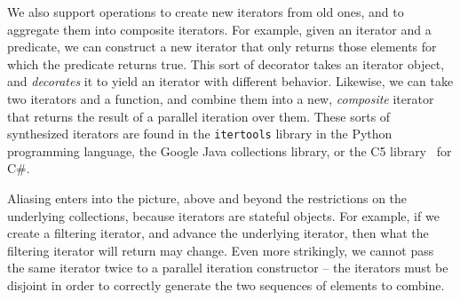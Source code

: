 \documentclass[preprint,natbib]{sigplanconf}
\begin{document}
We also support operations to create new iterators from old ones, and
to aggregate them into composite iterators. For example, given an
iterator and a predicate, we can construct a new iterator that only
returns those elements for which the predicate returns true. This sort
of decorator takes an iterator object, and \emph{decorates} it to
yield an iterator with different behavior. Likewise, we can take two
iterators and a function, and combine them into a new,
\emph{composite} iterator that returns the result of a parallel
iteration over them.  These sorts of synthesized iterators are found
in the \texttt{itertools} library in the Python programming language,
the Google Java collections library, or the C5 library~\cite{C5} for
C\#.

Aliasing enters into the picture, above and beyond the restrictions on
the underlying collections, because iterators are stateful
objects. For example, if we create a filtering iterator, and advance
the underlying iterator, then what the filtering iterator will return
may change. Even more strikingly, we cannot pass the same iterator
twice to a parallel iteration constructor -- the iterators must be
disjoint in order to correctly generate the two sequences of elements
to combine.
\end{document}
